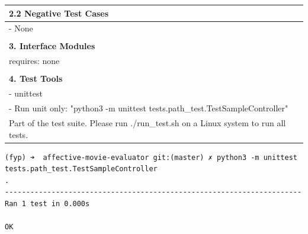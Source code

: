 \documentclass[12pt,a4paper,man]{report}
\begin{document}
\begin{longtable}{|p{7in}|}
\hline
\textbf{2.2 Negative Test Cases}\\
\hline
- None\\
\\
\hline
\textbf{3. Interface Modules}\\
\hline
requires: none\\
\\
\hline
\textbf{4. Test Tools}\\
\hline
- unittest\\
- Run unit only: "python3 -m unittest tests.path\_test.TestSampleController"\\
Part of the test suite. Please run ./run\_test.sh on a Linux system to run all tests.\\
\hline
\end{longtable}


\begin{verbatim}
(fyp) ➜  affective-movie-evaluator git:(master) ✗ python3 -m unittest tests.path_test.TestSampleController
.
----------------------------------------------------------------------
Ran 1 test in 0.000s

OK
\end{verbatim}
\end{document}
